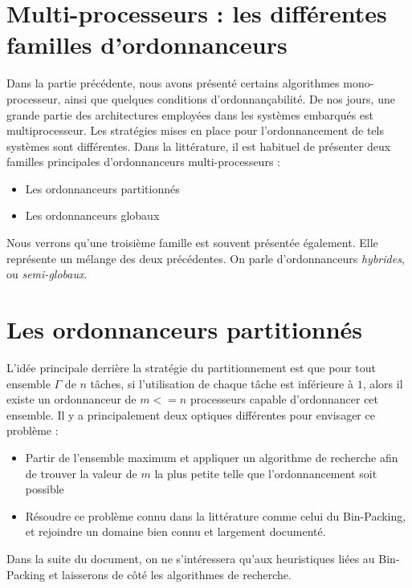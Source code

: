 \documentclass[11pt,a4paper,oneside]{report}
\begin{document}
\section{Multi-processeurs : les différentes familles d'ordonnanceurs}
Dans la partie précédente, nous avons présenté certains algorithmes mono-processeur, 
ainsi que quelques conditions d'ordonnançabilité.
De nos jours, une grande partie des architectures employées dans les systèmes embarqués 
est multiprocesseur. 
Les stratégies mises en place pour l'ordonnancement de tels 
systèmes sont différentes. Dans la littérature, il est habituel de présenter 
deux familles principales d'ordonnanceurs multi-processeurs :\\
\begin{itemize}
	\item Les ordonnanceurs partitionnés
	\item Les ordonnanceurs globaux
\end{itemize}
Nous verrons qu'une troisième famille est souvent présentée également. Elle représente un 
mélange des deux précédentes. On parle d'ordonnanceurs \textit{hybrides}, ou \textit{semi-globaux}.

\section{Les ordonnanceurs partitionnés}
L'idée principale derrière la stratégie du partitionnement est que pour tout 
ensemble $\Gamma$ de $n$ tâches, si l'utilisation de chaque tâche est inférieure à $1$, 
alors il existe un ordonnanceur de $m <= n$ processeurs capable d'ordonnancer cet ensemble. 
Il y a principalement deux optiques différentes pour envisager ce problème : \\
\begin{itemize}
	\item Partir de l'ensemble maximum et appliquer un algorithme de recherche afin de trouver 
	la valeur de $m$ la plus petite telle que l'ordonnancement soit possible
	\item Résoudre ce problème connu dans la littérature comme celui du Bin-Packing, 
	et rejoindre un domaine bien connu et largement documenté.
\end{itemize}
Dans la suite du document, on ne s'intéressera qu'aux heuristiques liées au Bin-Packing et 
laisserons de côté les algorithmes de recherche.
\end{document}
